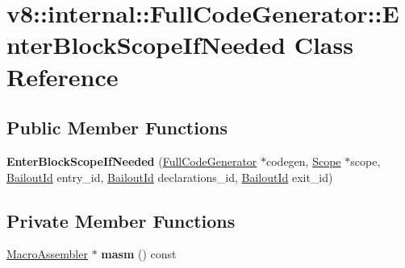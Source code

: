 \hypertarget{classv8_1_1internal_1_1_full_code_generator_1_1_enter_block_scope_if_needed}{}\section{v8\+:\+:internal\+:\+:Full\+Code\+Generator\+:\+:Enter\+Block\+Scope\+If\+Needed Class Reference}
\label{classv8_1_1internal_1_1_full_code_generator_1_1_enter_block_scope_if_needed}
\subsection*{Public Member Functions}
\begin{DoxyCompactItemize}
\item 
{\bfseries Enter\+Block\+Scope\+If\+Needed} (\hyperlink{classv8_1_1internal_1_1_full_code_generator}{Full\+Code\+Generator} $\ast$codegen, \hyperlink{classv8_1_1internal_1_1_scope}{Scope} $\ast$scope, \hyperlink{classv8_1_1internal_1_1_bailout_id}{Bailout\+Id} entry\+\_\+id, \hyperlink{classv8_1_1internal_1_1_bailout_id}{Bailout\+Id} declarations\+\_\+id, \hyperlink{classv8_1_1internal_1_1_bailout_id}{Bailout\+Id} exit\+\_\+id)\hypertarget{classv8_1_1internal_1_1_full_code_generator_1_1_enter_block_scope_if_needed_a356c4c9587933fcda98e5c5700b3ba4c}{}\label{classv8_1_1internal_1_1_full_code_generator_1_1_enter_block_scope_if_needed_a356c4c9587933fcda98e5c5700b3ba4c}

\end{DoxyCompactItemize}
\subsection*{Private Member Functions}
\begin{DoxyCompactItemize}
\item 
\hyperlink{classv8_1_1internal_1_1_macro_assembler}{Macro\+Assembler} $\ast$ {\bfseries masm} () const \hypertarget{classv8_1_1internal_1_1_full_code_generator_1_1_enter_block_scope_if_needed_ab43dfc9f813b3a9bb8f87d42f0d68aa2}{}\label{classv8_1_1internal_1_1_full_code_generator_1_1_enter_block_scope_if_needed_ab43dfc9f813b3a9bb8f87d42f0d68aa2}

\end{DoxyCompactItemize}

